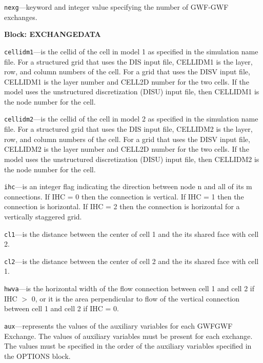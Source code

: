 \begin{description}
\item \texttt{nexg}---keyword and integer value specifying the number of GWF-GWF exchanges.

\end{description}
\item \textbf{Block: EXCHANGEDATA}

\begin{description}
\item \texttt{cellidm1}---is the cellid of the cell in model 1 as specified in the simulation name file. For a structured grid that uses the DIS input file, CELLIDM1 is the layer, row, and column numbers of the cell.   For a grid that uses the DISV input file, CELLIDM1 is the layer number and CELL2D number for the two cells.  If the model uses the unstructured discretization (DISU) input file, then CELLIDM1 is the node number for the cell.

\item \texttt{cellidm2}---is the cellid of the cell in model 2 as specified in the simulation name file. For a structured grid that uses the DIS input file, CELLIDM2 is the layer, row, and column numbers of the cell.   For a grid that uses the DISV input file, CELLIDM2 is the layer number and CELL2D number for the two cells.  If the model uses the unstructured discretization (DISU) input file, then CELLIDM2 is the node number for the cell.

\item \texttt{ihc}---is an integer flag indicating the direction between node n and all of its m connections. If IHC = 0 then the connection is vertical.  If IHC = 1 then the connection is horizontal. If IHC = 2 then the connection is horizontal for a vertically staggered grid.

\item \texttt{cl1}---is the distance between the center of cell 1 and the its shared face with cell 2.

\item \texttt{cl2}---is the distance between the center of cell 2 and the its shared face with cell 1.

\item \texttt{hwva}---is the horizontal width of the flow connection between cell 1 and cell 2 if IHC $>$ 0, or it is the area perpendicular to flow of the vertical connection between cell 1 and cell 2 if IHC = 0.

\item \texttt{aux}---represents the values of the auxiliary variables for each GWFGWF Exchange. The values of auxiliary variables must be present for each exchange. The values must be specified in the order of the auxiliary variables specified in the OPTIONS block.

\end{description}


